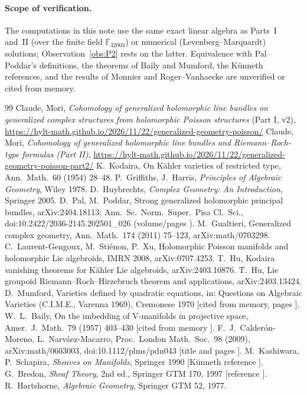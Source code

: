 \paragraph{Scope of verification.}The computations in this note use the same exact linear algebra as Parts~I and~II (over the finite field $\mathbb F_{32003}$) or numerical (Levenberg--Marquardt) solutions; Observation~\ref{obs:P2} rests on the latter. Equivalence with Pal--Poddar's definitions, the theorems of Baily and Mumford, the K\"unneth references, and the results of Monnier and Roger--Vanhaecke are unverified or cited from memory.

\begin{thebibliography}{99}\small
{} Claude, Mori, \emph{Cohomology of generalized holomorphic line bundles on generalized complex structures from holomorphic Poisson structures} (Part I, v2), \url{https://hylt-math.github.io/2026/11/22/generalized-geometry-poisson/}
 Claude, Mori, \emph{Cohomology of generalized holomorphic line bundles and Riemann--Roch-type formulas (Part II)}, \url{https://hylt-math.github.io/2026/11/22/generalized-geometry-poisson-part2/}
 K.\ Kodaira, On K\"ahler varieties of restricted type, Ann.\ Math.\ 60 (1954) 28--48.
 P.\ Griffiths, J.\ Harris, \emph{Principles of Algebraic Geometry}, Wiley 1978.
 D.\ Huybrechts, \emph{Complex Geometry: An Introduction}, Springer 2005.
 D.\ Pal, M.\ Poddar, Strong generalized holomorphic principal bundles, arXiv:2404.18113; Ann.\ Sc.\ Norm.\ Super.\ Pisa Cl.\ Sci., doi:10.2422/2036-2145.202501\_026 (volume/pages \tQ).
 M.\ Gualtieri, Generalized complex geometry, Ann.\ Math.\ 174 (2011) 75--123, arXiv:math/0703298.
 C.\ Laurent-Gengoux, M.\ Sti\'enon, P.\ Xu, Holomorphic Poisson manifolds and holomorphic Lie algebroids, IMRN 2008, arXiv:0707.4253.
 T.\ Hu, Kodaira vanishing theorems for K\"ahler Lie algebroids, arXiv:2403.10876.
 T.\ Hu, Lie groupoid Riemann--Roch--Hirzebruch theorem and applications, arXiv:2403.13424.
 D.\ Mumford, Varieties defined by quadratic equations, in: Questions on Algebraic Varieties (C.I.M.E., Varenna 1969), Cremonese 1970 [cited from memory, pages \tQ].
 W.\ L.\ Baily, On the imbedding of V-manifolds in projective space, Amer.\ J.\ Math.\ 79 (1957) 403--430 [cited from memory \tQ].
 F.\ J.\ Calder\'on-Moreno, L.\ Narv\'aez-Macarro, Proc.\ London Math.\ Soc.\ 98 (2009), arXiv:math/0603003, doi:10.1112/plms/pdn043 [title and pages \tQ].
 M.\ Kashiwara, P.\ Schapira, \emph{Sheaves on Manifolds}, Springer 1990 [K\"unneth reference \tQ].
 G.\ Bredon, \emph{Sheaf Theory}, 2nd ed., Springer GTM 170, 1997 [reference \tQ].
 R.\ Hartshorne, \emph{Algebraic Geometry}, Springer GTM 52, 1977.
\end{thebibliography}
